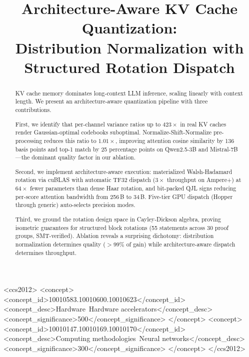 \documentclass[sigconf,anonymous,review]{acmart}
\begin{document}
\title{Architecture-Aware KV Cache Quantization:\\Distribution Normalization with Structured Rotation Dispatch}

\begin{CCSXML}
<ccs2012>
<concept>
<concept_id>10010583.10010600.10010623</concept_id>
<concept_desc>Hardware~Hardware accelerators</concept_desc>
<concept_significance>500</concept_significance>
</concept>
<concept>
<concept_id>10010147.10010169.10010170</concept_id>
<concept_desc>Computing methodologies~Neural networks</concept_desc>
<concept_significance>300</concept_significance>
</concept>
</ccs2012>
\end{CCSXML}



\begin{abstract}
KV cache memory dominates long-context LLM inference, scaling
linearly with context length. We present an architecture-aware
quantization pipeline with three contributions.

First, we identify that per-channel variance ratios up to $423\times$ in
real KV caches render Gaussian-optimal codebooks suboptimal.
Normalize-Shift-Normalize pre-processing reduces this ratio to
$1.01\times$, improving attention cosine similarity by 136 basis points
and top-1 match by 25 percentage points on Qwen2.5-3B and
Mistral-7B---the dominant quality factor in our ablation.

Second, we implement architecture-aware execution: materialized
Walsh-Hadamard rotation via cuBLAS with automatic TF32 dispatch
($3\times$ throughput on Ampere+) at $64\times$ fewer parameters than dense
Haar rotation, and bit-packed QJL signs reducing per-score
attention bandwidth from 256\,B to 34\,B. Five-tier GPU dispatch
(Hopper through generic) auto-selects precision modes.

Third, we ground the rotation design space in Cayley-Dickson
algebra, proving isometric guarantees for structured block
rotations (55 statements across 30 proof groups, SMT-verified). Ablation reveals a
surprising dichotomy: distribution normalization determines
quality ($>$99\% of gain) while architecture-aware dispatch
determines throughput.
\end{abstract}
\end{document}
